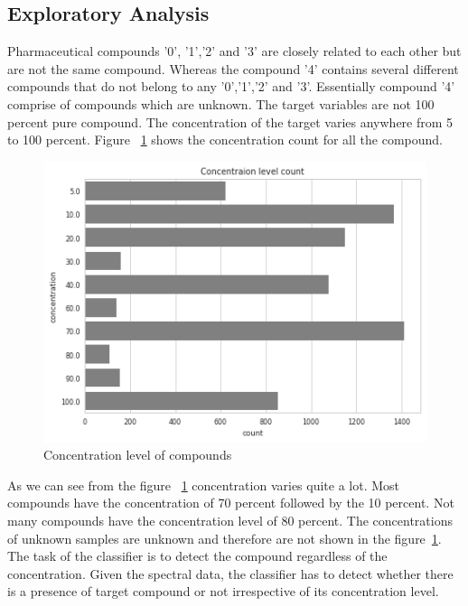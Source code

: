 \subsection{Exploratory Analysis}
Pharmaceutical compounds '0', '1','2' and '3' are closely related to each other but are not the same compound. Whereas the compound '4' contains several different compounds that do not belong to any '0','1','2' and '3'. Essentially compound '4' comprise of compounds which  are unknown. The target variables are not 100 percent pure compound. The concentration of the target varies anywhere from 5 to 100 percent. Figure ~\ref{fig:variable concentration} shows the concentration count for all the compound.

\begin{figure}[ht]
	\begin{center}
		\includegraphics[width=\textwidth]{images/variable_composition.png}
		\caption{Concentration level of compounds}
		\label{fig:variable concentration}
	\end{center}
\end{figure}

As we can see from the figure ~\ref{fig:variable concentration} concentration varies quite a lot. Most compounds have the concentration of 70 percent followed by the 10 percent. Not many compounds have the concentration level of 80 percent. The concentrations of unknown samples are unknown and therefore are not shown in the figure~\ref{fig:variable concentration}. The task of the classifier is to detect the compound regardless of the concentration. Given the spectral data, the classifier has to detect whether there is a presence of target compound or not irrespective of its concentration level. 


